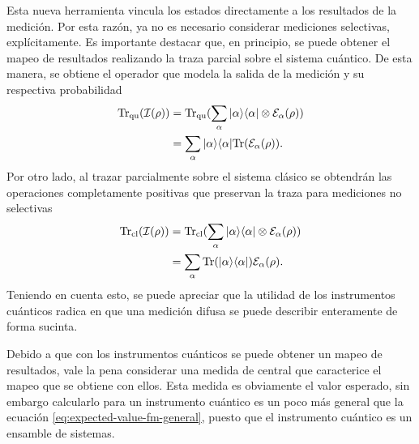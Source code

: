 Esta nueva herramienta vincula los estados directamente a los resultados de la medición. Por esta razón, ya no es necesario considerar mediciones selectivas, explícitamente.  Es importante destacar que, en principio, se puede obtener el mapeo de resultados realizando la traza parcial sobre el sistema cuántico. De esta manera, se obtiene el operador que modela la salida de la medición y su respectiva probabilidad \begin{equation}
    \begin{split}
    {\rm Tr}_{\text{qu}}(\mathcal{I}(\rho))&={\rm Tr}_{\text{qu}}(\sum_\alpha |\alpha\rangle \langle\alpha|\otimes \mathcal{E}_\alpha(\rho))\\
    &=\sum_\alpha |\alpha\rangle \langle\alpha|{\rm Tr}(\mathcal{E}_\alpha(\rho)).
\end{split}
\end{equation}Por otro lado, al trazar parcialmente sobre el sistema clásico se obtendrán  las operaciones completamente positivas que preservan la traza para mediciones no selectivas\begin{equation}
    \begin{split}
        {\rm Tr}_{\text{cl}}(\mathcal{I}(\rho))&={\rm Tr}_{\text{cl}} (\sum_\alpha |\alpha\rangle \langle\alpha|\otimes \mathcal{E}_\alpha(\rho))\\
        &=\sum_\alpha {\rm Tr}(|\alpha\rangle \langle\alpha|)\mathcal{E}_\alpha(\rho).
    \end{split}
\end{equation}Teniendo en cuenta esto, se puede apreciar que la utilidad de los instrumentos cuánticos radica en que una medición difusa se puede describir enteramente de forma sucinta. 












Debido a que con los instrumentos cuánticos se puede obtener un mapeo de resultados, vale la pena considerar una medida de central que caracterice el mapeo que se obtiene con ellos. Esta medida es obviamente el valor esperado, sin embargo calcularlo para un instrumento cuántico es un poco más general que la ecuación {\eqref{eq:expected-value-fm-general}}, puesto que el instrumento cuántico es un ensamble de sistemas.


